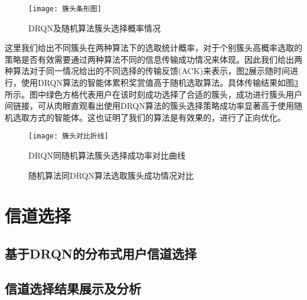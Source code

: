 \begin{figure}[htbp]
	\centering
	\texttt{[image: 簇头条形图]}
	\caption{DRQN及随机算法簇头选择概率情况}
	\label{fig：簇头条形图}
\end{figure}
这里我们给出不同簇头在两种算法下的选取统计概率，对于个别簇头高概率选取的策略是否有效需要通过两种算法不同的信息传输成功情况来体现。因此我们给出两种算法对于同一情况给出的不同选择的传输反馈(ACK)来表示，图\ref{fig：簇头对比折线}展示随时间进行，使用DRQN算法的智能体累积奖赏值高于随机选取算法。具体传输结果如图\ref{fig:簇头奖励对比}所示。图中绿色方格代表用户在该时刻成功选择了合适的簇头，成功进行簇头用户间链接，可从肉眼直观看出使用DRQN算法的簇头选择策略成功率显著高于使用随机选取方式的智能体。这也证明了我们的算法是有效果的，进行了正向优化。
\begin{figure}[htbp]
	\centering
	\texttt{[image: 簇头对比折线]}
	\caption{DRQN同随机算法簇头选择成功率对比曲线}
	\label{fig：簇头对比折线}
\end{figure}

\begin{figure}[htbp]
	\begin{minipage}{\textwidth}
		\centering
		\subfigure{\label{fig:簇头奖励DRQN}}\addtocounter{subfigure}{-2}
		\hspace{1em}
		\subfigure{\label{fig:簇头奖励random}}\addtocounter{subfigure}{-2}
		\hspace{1em}	
	\end{minipage}
	\vspace{0.2em}
	\caption{随机算法同DRQN算法选取簇头成功情况对比}\label{fig:簇头奖励对比}
\end{figure}




\section{信道选择}
\subsection{基于DRQN的分布式用户信道选择}

\subsection{信道选择结果展示及分析}

